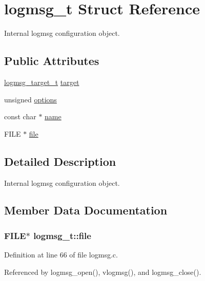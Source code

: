 \hypertarget{structlogmsg__t}{
\section{logmsg\-\_\-t \-Struct \-Reference}
\label{structlogmsg__t}
}


\-Internal logmsg configuration object.  


\subsection*{\-Public \-Attributes}
\begin{DoxyCompactItemize}
\item 
\hyperlink{logmsg_8h_a79de13cee8c9b70b7851d97b86d4bbe5}{logmsg\-\_\-target\-\_\-t} \hyperlink{structlogmsg__t_a5418565614b492b504535521be6344a3}{target}
\item 
unsigned \hyperlink{structlogmsg__t_acb37605a8ed44417a2c4d1c9a87f6e18}{options}
\item 
const char $\ast$ \hyperlink{structlogmsg__t_a65a535ef1b66e02ac0fd9bf222255d7d}{name}
\item 
\-F\-I\-L\-E $\ast$ \hyperlink{structlogmsg__t_ae12c1c088667a99d8dfb6f4451d8e454}{file}
\end{DoxyCompactItemize}


\subsection{\-Detailed \-Description}
\-Internal logmsg configuration object. 



\subsection{\-Member \-Data \-Documentation}
\hypertarget{structlogmsg__t_ae12c1c088667a99d8dfb6f4451d8e454}{
\subsubsection[{file}]{\setlength{\rightskip}{0pt plus 5cm}\-F\-I\-L\-E$\ast$ {\bf logmsg\-\_\-t\-::file}}}
\label{structlogmsg__t_ae12c1c088667a99d8dfb6f4451d8e454}


\-Definition at line 66 of file logmsg.\-c.



\-Referenced by logmsg\-\_\-open(), vlogmsg(), and logmsg\-\_\-close().

